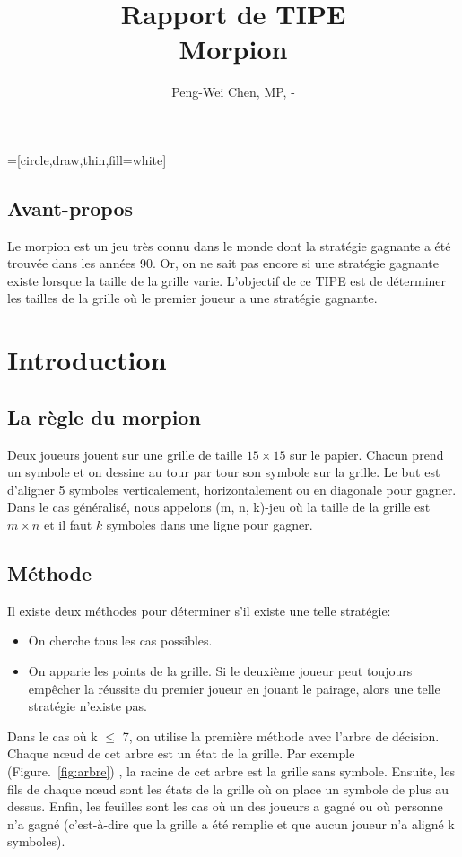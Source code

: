 \documentclass[12pt, a4paper]{article}
\title{Rapport de TIPE\\
Morpion}
\author{Peng-Wei Chen, MP, \oldstylenums{2017}-\oldstylenums{2018}}
\date{}
\begin{document}
\maketitle
{}=[circle,draw,thin,fill=white]

\subsection*{Avant-propos}
Le morpion est un jeu très connu dans le monde dont la stratégie gagnante a été trouvée dans les années 90. Or, on ne sait pas encore si une stratégie gagnante existe lorsque la taille de la grille varie. L'objectif de ce TIPE est de déterminer les tailles de la grille où le premier joueur a une stratégie gagnante.

\section{Introduction}
\subsection{La règle du morpion}
Deux joueurs jouent sur une grille de taille $15 \times 15$ sur le papier. Chacun prend un symbole et on dessine au tour par tour son symbole sur la grille. Le but est d'aligner 5 symboles verticalement, horizontalement ou en diagonale pour gagner.
Dans le cas généralisé, nous appelons (m, n, k)-jeu où la taille de la grille est $m \times n$ et il faut $k$ symboles dans une ligne pour gagner.

\subsection{Méthode}
Il existe deux méthodes pour déterminer s'il existe une telle stratégie:
\begin{itemize}
    \item On cherche tous les cas possibles.
    \item On apparie les points de la grille. Si le deuxième joueur peut toujours empêcher la réussite du premier joueur en jouant le pairage, alors une telle stratégie n'existe pas.
\end{itemize}

Dans le cas où k $\le$ 7, on utilise la première méthode avec l'arbre de décision. Chaque nœud de cet arbre est un état de la grille. Par exemple (\mbox{Figure. \ref{fig:arbre}}) , la racine de cet arbre est la grille sans symbole. Ensuite, les fils de chaque nœud sont les états de la grille où on place un symbole de plus au dessus. Enfin, les feuilles sont les cas où un des joueurs a gagné ou où personne n'a gagné (c'est-à-dire que la grille a été remplie et que aucun joueur n'a aligné k symboles).
\end{document}
